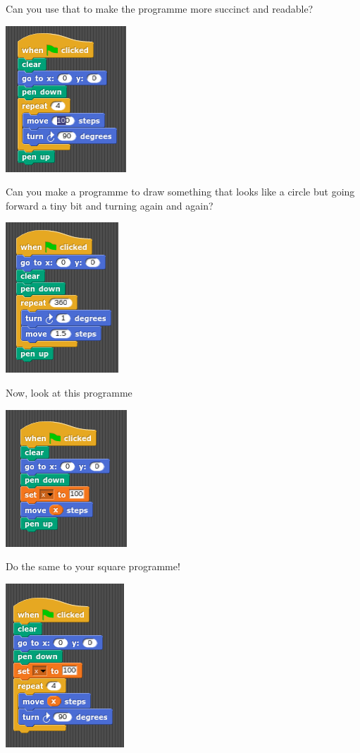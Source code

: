 \documentclass[11pt,a4paper]{scrartcl}
\begin{document}
Can you use that to make the programme more succinct and readable? 
\begin{center}
\includegraphics{repeat_square.png}
\end{center}
Can you make a programme to draw something that looks like a circle but going forward a tiny bit and turning again and again?
\begin{center}
\includegraphics{circle.png}
\end{center}

Now, look at this programme
\begin{center}
\includegraphics{variable.png}
\end{center}
Do the same to your square programme!
\begin{center}
\includegraphics{variable_square.png}
\end{center}
\end{document}
